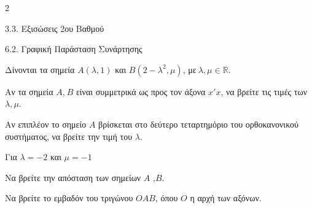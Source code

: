 \begin{ylh}{2}
    \item 3.3. Εξισώσεις 2ου Βαθμού
    \item 6.2. Γραφική Παράσταση Συνάρτησης
\end{ylh}
Δίνονται τα σημεία $A(\lambda,1)$ και $B(2 - \lambda^{2},\mu)$, με$\ \lambda,\mu\mathbb{\in R}$.

\begin{alist}
\item Αν τα σημεία $A$,$\ B$ είναι συμμετρικά ως προς τον άξονα $x'x$, να βρείτε τις τιμές των $\lambda,\mu$.
\item Αν επιπλέον το σημείο $A$ βρίσκεται στο δεύτερο τεταρτημόριο του ορθοκανονικού συστήματος, να βρείτε την τιμή του $\lambda$.
\item Για $\lambda = - 2$ και $\mu = - 1$

\begin{rlist}
\item
  Να βρείτε την απόσταση των σημείων $A$ ,$B$.
\item
  Να βρείτε το εμβαδόν του τριγώνου $OAB$, όπου $O$ η αρχή των αξόνων.
\end{rlist}
\end{alist}

